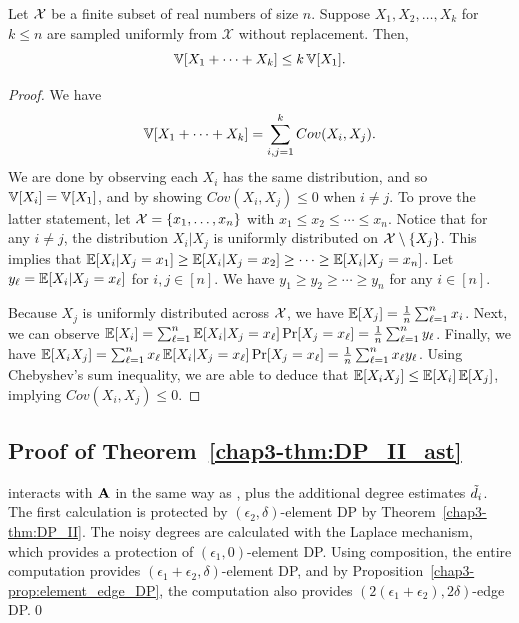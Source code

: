 \begin{lemma}\label{chap3-lem:sampling_replacement_var}
Let $\mathcal{X}$ be a finite subset of real numbers of size $n$.
Suppose $X_1, X_2, \ldots, X_k$ for $k \leq n$ are sampled
uniformly from $\mathcal{X}$ without replacement. Then,
\[
  \operatorname{\mathbb{V}}[X_1 + \cdots + X_k] \leq k \operatorname{\mathbb{V}}[X_1].
\]
\end{lemma}
\begin{proof}
  We have
  \[
    \operatorname{\mathbb{V}}[X_1 + \cdots + X_k] = \sum_{i,j=1}^k Cov(X_i, X_j).
  \]
  We are done by observing each $X_i$ has the same distribution, and so $\operatorname{\mathbb{V}}[X_i] = \operatorname{\mathbb{V}}[X_1]$, and by showing $Cov(X_i, X_j) \leq 0$ when $i \neq j$. To prove the latter statement,
  let $\mathcal{X} = \{x_1, \ldots, x_n\}$ with $x_1 \leq x_2 \leq \cdots \leq x_n$.
  Notice that for any $i \neq j$, the distribution $X_i | X_j$ is uniformly distributed
  on $\mathcal{X} \setminus \{X_j\}$. This implies that $\operatorname{\mathbb{E}}[X_i | X_j = x_1] \geq \operatorname{\mathbb{E}}[X_i | X_j = x_2]
  \geq \cdots \geq \operatorname{\mathbb{E}}[X_i | X_j = x_n]$. Let
  $y_\ell = \operatorname{\mathbb{E}}[X_i | X_j = x_\ell]$ for $i,j \in [n]$. We have
  $y_1 \geq y_2 \geq \cdots \geq y_n$ for any $i \in [n]$.

  Because $X_j$ is uniformly distributed across $\mathcal{X}$, we have $\operatorname{\mathbb{E}}[X_j] = \frac{1}{n} \sum_{\ell=1}^n x_i$.
  Next, we can observe $\operatorname{\mathbb{E}}[X_i] = \sum_{\ell=1}^n \operatorname{\mathbb{E}}[X_i | X_j = x_\ell] \allowbreak \Pr[X_j = x_\ell] = \frac{1}{n} \sum_{\ell=1}^n y_\ell$.
  Finally, we have $\operatorname{\mathbb{E}}[X_i X_j] = \sum_{\ell=1}^n x_\ell \allowbreak \operatorname{\mathbb{E}}[X_i | X_j = x_\ell] \Pr[X_j = x_\ell] = \frac{1}{n} \sum_{\ell=1}^n x_\ell y_\ell $. Using Chebyshev's sum inequality, we are able to deduce that $\operatorname{\mathbb{E}}[X_iX_j] \leq \operatorname{\mathbb{E}}[X_i]\operatorname{\mathbb{E}}[X_j]$, implying $Cov(X_i, X_j) \leq 0$.
\end{proof}

\subsection{Proof of Theorem~\ref{chap3-thm:DP_II_ast}}
\label{chap3-sub:DP_II_ast_proof}
\AlgWSTriVR{} interacts with $\mathbf{A}$ in the same way as \AlgWSTri{}, plus the additional degree estimates $\tilde{d}_i$. The first calculation is protected by
$(\epsilon_2, \delta)$-element DP by Theorem~\ref{chap3-thm:DP_II}. The noisy degrees
are calculated with the Laplace mechanism, which provides a protection of
$(\epsilon_1, 0)$-element DP. Using composition, the entire computation provides
$(\epsilon_1 + \epsilon_2, \delta)$-element DP, and by
Proposition~\ref{chap3-prop:element_edge_DP}, the computation also provides
$(2(\epsilon_1 + \epsilon_2), 2\delta)$-edge DP.\qed

